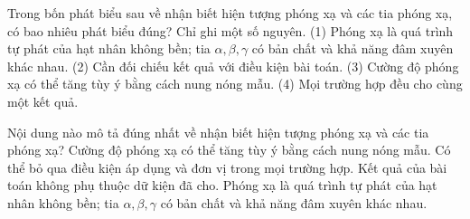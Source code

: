 \begin{ex}
Trong bốn phát biểu sau về nhận biết hiện tượng phóng xạ và các tia phóng xạ, có bao nhiêu phát biểu đúng? Chỉ ghi một số nguyên. (1) Phóng xạ là quá trình tự phát của hạt nhân không bền; tia $\alpha,\beta,\gamma$ có bản chất và khả năng đâm xuyên khác nhau. (2) Cần đối chiếu kết quả với điều kiện bài toán. (3) Cường độ phóng xạ có thể tăng tùy ý bằng cách nung nóng mẫu. (4) Mọi trường hợp đều cho cùng một kết quả.
\end{ex}

\begin{ex}
Nội dung nào mô tả đúng nhất về nhận biết hiện tượng phóng xạ và các tia phóng xạ?
\choice
{Cường độ phóng xạ có thể tăng tùy ý bằng cách nung nóng mẫu.}
{Có thể bỏ qua điều kiện áp dụng và đơn vị trong mọi trường hợp.}
{Kết quả của bài toán không phụ thuộc dữ kiện đã cho.}
{\True Phóng xạ là quá trình tự phát của hạt nhân không bền; tia $\alpha,\beta,\gamma$ có bản chất và khả năng đâm xuyên khác nhau.}
\end{ex}

